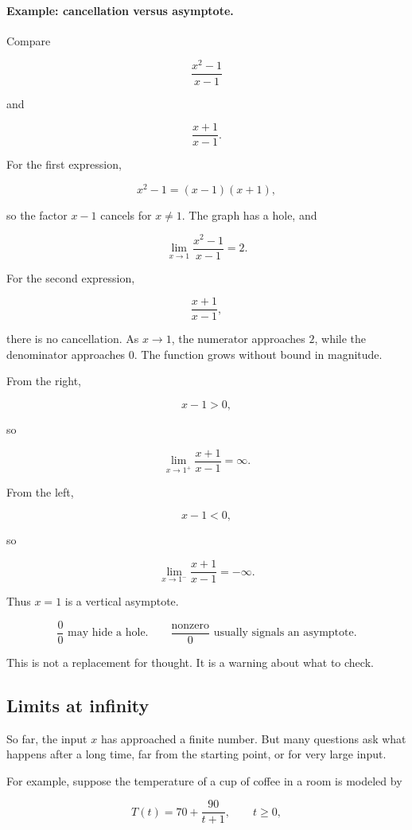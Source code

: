\paragraph{Example: cancellation versus asymptote.}
Compare

\[
\frac{x^2-1}{x-1}
\]

and

\[
\frac{x+1}{x-1}.
\]

For the first expression,

\[
x^2-1=(x-1)(x+1),
\]

so the factor \(x-1\) cancels for \(x\neq1\).  The graph has a hole, and

\[
\lim_{x\to1}\frac{x^2-1}{x-1}=2.
\]

For the second expression,

\[
\frac{x+1}{x-1},
\]

there is no cancellation.  As \(x\to1\), the numerator approaches \(2\), while the denominator approaches \(0\).  The function grows without bound in magnitude.

From the right,

\[
x-1>0,
\]

so

\[
\lim_{x\to1^+}\frac{x+1}{x-1}=\infty.
\]

From the left,

\[
x-1<0,
\]

so

\[
\lim_{x\to1^-}\frac{x+1}{x-1}=-\infty.
\]

Thus \(x=1\) is a vertical asymptote.

\[
\boxed{\frac00\text{ may hide a hole.}
\qquad
\frac{\text{nonzero}}0\text{ usually signals an asymptote.}}
\]

This is not a replacement for thought.  It is a warning about what to check.

\subsection{Limits at infinity}
\label{subsec:limits-at-infinity}

So far, the input \(x\) has approached a finite number.  But many questions ask what happens after a long time, far from the starting point, or for very large input.

For example, suppose the temperature of a cup of coffee in a room is modeled by

\[
T(t)=70+\frac{90}{t+1},
\qquad t\ge0,
\]

